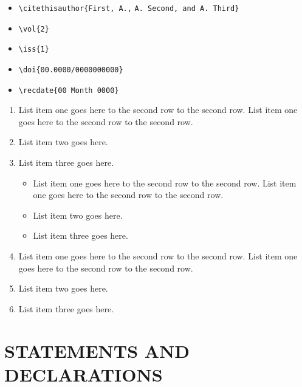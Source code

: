 \documentclass[OA]{nbr_article}
\begin{document}
	\lipsum[27-29]
	
	
	\begin{itemize}
		\item \verb"\citethisauthor{First, A.,"
			\verb"A. Second, and A. Third}"
		\item \verb"\vol{2}"
		\item \verb"\iss{1}"
		\item \verb"\doi{00.0000/0000000000}"
		\item \verb"\recdate{00 Month 0000}"
	\end{itemize}
	
	\begin{enumerate}
		\item
		List item one goes here to the second row to the second row. List item one goes here to the second row to the second row.
		
		\item
		List item two goes here.
		
		\item
		List item three goes here.
		\begin{itemize}
			\item
			List item one goes here to the second row to the second row. List item one goes here to the second row to the second row.
			
			\item
			List item two goes here.
			
			\item
			List item three goes here.
		\end{itemize}
		\item
		List item one goes here to the second row to the second row. List item one goes here to the second row to the second row.
		
		\item
		List item two goes here.
		
		\item
		List item three goes here.
	\end{enumerate}
	
	
	\section*{STATEMENTS AND DECLARATIONS}
	
\end{document}

